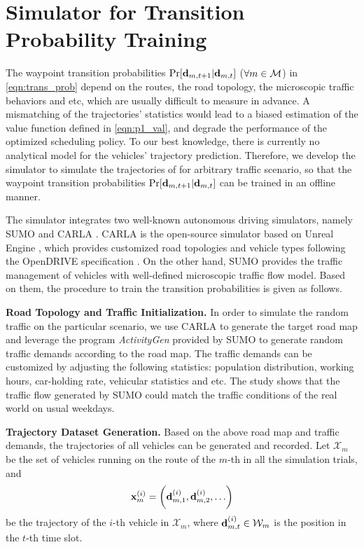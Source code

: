 \section{{\fwName} Simulator for Transition Probability Training}
\label{sec:framework}

The waypoint transition probabilities $\Pr[\mathbf{d}_{m,t+1}|\mathbf{d}_{m,t}]$ ($\forall m\in\mathcal{M}$) in \eqref{eqn:trans_prob} depend on the routes, the road topology, the microscopic traffic behaviors and etc, which are usually difficult to measure in advance.
A mismatching of the trajectories' statistics would lead to a biased estimation of the value function defined in \eqref{eqn:p1_val}, and degrade the performance of the optimized scheduling policy. To our best knowledge, there is currently no analytical model for the vehicles' trajectory prediction.
Therefore, we develop the {\fwName} simulator to simulate the trajectories of {\IAVs} for arbitrary traffic scenario, so that the waypoint transition probabilities $\Pr[\mathbf{d}_{m,t+1}|\mathbf{d}_{m,t}]$ can be trained in an offline manner.

The {\fwName} simulator integrates two well-known autonomous driving simulators, namely SUMO \cite{SUMO} and CARLA \cite{CARLA}.
CARLA is the open-source simulator based on Unreal Engine \cite{unrealengine}, which provides customized road topologies and vehicle types following the OpenDRIVE specification \cite{OpenDRIVE}.
On the other hand, SUMO provides the traffic management of vehicles with well-defined microscopic traffic flow model.
Based on them, the procedure to train the transition probabilities is given as follows.

\textbf{Road Topology and Traffic Initialization.} In order to simulate the random traffic on the particular scenario, we use CARLA to generate the target road map and leverage the program \emph{ActivityGen} provided by SUMO to generate random traffic demands according to the road map. The traffic demands can be customized by adjusting the following statistics: population distribution, working hours, car-holding rate, vehicular statistics and etc.
The study \cite{sumo-accuracy-mdpi} shows that the traffic flow generated by SUMO could match the traffic conditions of the real world on usual weekdays.

\textbf{Trajectory Dataset Generation.} Based on the above road map and traffic demands, the trajectories of all vehicles can be generated and recorded.
Let $\mathcal{X}_{m} $ be the set of vehicles running on the route of the $m$-th {\IAV} in all the simulation trials, and $$ \vec{x}^{(i)}_{m} = \Paren{ \vec{d}^{(i)}_{m,1}, \vec{d}^{(i)}_{m,2}, \dots }$$ be the trajectory of the $ i $-th vehicle in $\mathcal{X}_{m}$, where $\mathbf{d}^{(i)}_{m,t} \in \mathcal{W}_{m}$ is the position in the $ t $-th time slot.

